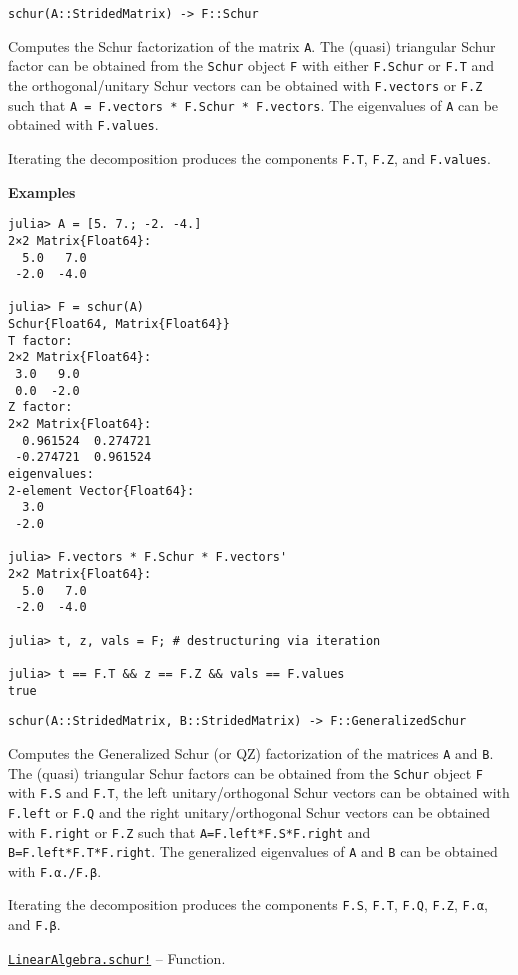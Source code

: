 \begin{adjustwidth}{2em}{0pt}


\begin{verbatim}
schur(A::StridedMatrix) -> F::Schur
\end{verbatim}

Computes the Schur factorization of the matrix \texttt{A}. The (quasi) triangular Schur factor can be obtained from the \texttt{Schur} object \texttt{F} with either \texttt{F.Schur} or \texttt{F.T} and the orthogonal/unitary Schur vectors can be obtained with \texttt{F.vectors} or \texttt{F.Z} such that \texttt{A = F.vectors * F.Schur * F.vectors{\textquotesingle}}. The eigenvalues of \texttt{A} can be obtained with \texttt{F.values}.

Iterating the decomposition produces the components \texttt{F.T}, \texttt{F.Z}, and \texttt{F.values}.

\textbf{Examples}


\begin{verbatim}
julia> A = [5. 7.; -2. -4.]
2×2 Matrix{Float64}:
  5.0   7.0
 -2.0  -4.0

julia> F = schur(A)
Schur{Float64, Matrix{Float64}}
T factor:
2×2 Matrix{Float64}:
 3.0   9.0
 0.0  -2.0
Z factor:
2×2 Matrix{Float64}:
  0.961524  0.274721
 -0.274721  0.961524
eigenvalues:
2-element Vector{Float64}:
  3.0
 -2.0

julia> F.vectors * F.Schur * F.vectors'
2×2 Matrix{Float64}:
  5.0   7.0
 -2.0  -4.0

julia> t, z, vals = F; # destructuring via iteration

julia> t == F.T && z == F.Z && vals == F.values
true
\end{verbatim}




\begin{lstlisting}
schur(A::StridedMatrix, B::StridedMatrix) -> F::GeneralizedSchur
\end{lstlisting}

Computes the Generalized Schur (or QZ) factorization of the matrices \texttt{A} and \texttt{B}. The (quasi) triangular Schur factors can be obtained from the \texttt{Schur} object \texttt{F} with \texttt{F.S} and \texttt{F.T}, the left unitary/orthogonal Schur vectors can be obtained with \texttt{F.left} or \texttt{F.Q} and the right unitary/orthogonal Schur vectors can be obtained with \texttt{F.right} or \texttt{F.Z} such that \texttt{A=F.left*F.S*F.right{\textquotesingle}} and \texttt{B=F.left*F.T*F.right{\textquotesingle}}. The generalized eigenvalues of \texttt{A} and \texttt{B} can be obtained with \texttt{F.α./F.β}.

Iterating the decomposition produces the components \texttt{F.S}, \texttt{F.T}, \texttt{F.Q}, \texttt{F.Z}, \texttt{F.α}, and \texttt{F.β}.



\end{adjustwidth}
\hypertarget{17231330544698367907}{}
\hyperlink{17231330544698367907}{\texttt{LinearAlgebra.schur!}}  -- {Function.}

